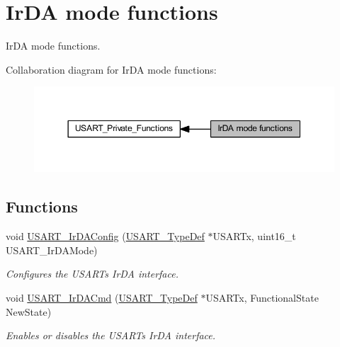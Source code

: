 \hypertarget{group___u_s_a_r_t___group7}{}\section{Ir\+DA mode functions}
\label{group___u_s_a_r_t___group7}


Ir\+DA mode functions.  


Collaboration diagram for Ir\+DA mode functions\+:
\nopagebreak
\begin{figure}[H]
\begin{center}
\leavevmode
\includegraphics[width=350pt]{group___u_s_a_r_t___group7}
\end{center}
\end{figure}
\subsection*{Functions}
\begin{DoxyCompactItemize}
\item 
void \hyperlink{group___u_s_a_r_t___group7_ga81a0cd36199040bf6d266b57babd678e}{U\+S\+A\+R\+T\+\_\+\+Ir\+D\+A\+Config} (\hyperlink{struct_u_s_a_r_t___type_def}{U\+S\+A\+R\+T\+\_\+\+Type\+Def} $\ast$U\+S\+A\+R\+Tx, uint16\+\_\+t U\+S\+A\+R\+T\+\_\+\+Ir\+D\+A\+Mode)
\begin{DoxyCompactList}\small\item\em Configures the U\+S\+A\+RT\textquotesingle{}s Ir\+DA interface. \end{DoxyCompactList}\item 
void \hyperlink{group___u_s_a_r_t___group7_gabff56ebb494fdfadcc6ef4fe9ac8dd24}{U\+S\+A\+R\+T\+\_\+\+Ir\+D\+A\+Cmd} (\hyperlink{struct_u_s_a_r_t___type_def}{U\+S\+A\+R\+T\+\_\+\+Type\+Def} $\ast$U\+S\+A\+R\+Tx, Functional\+State New\+State)
\begin{DoxyCompactList}\small\item\em Enables or disables the U\+S\+A\+RT\textquotesingle{}s Ir\+DA interface. \end{DoxyCompactList}\end{DoxyCompactItemize}



